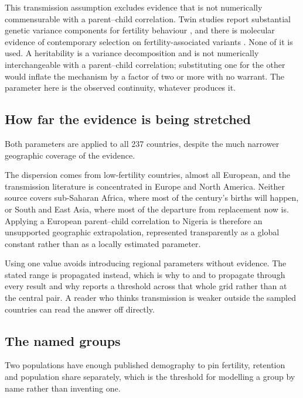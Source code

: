 This transmission assumption excludes evidence that is not numerically
commensurable with a parent--child correlation. Twin studies report substantial
genetic variance components for
fertility behaviour \citep{kohler1999}, and there is molecular evidence of
contemporary selection on fertility-associated variants
\citep{beauchamp2016,kong2017}. None of it is used. A heritability is a variance
decomposition and is not numerically interchangeable with a parent--child
correlation; substituting one for the other would inflate the mechanism by a
factor of two or more with no warrant. The parameter here is the observed
continuity, whatever produces it.

\subsection{How far the evidence is being stretched}
\label{sec:extrapolation}

Both parameters are applied to all 237 countries, despite the much narrower
geographic coverage of the evidence.

The dispersion comes from \CVCountries{} low-fertility countries, almost all
European, and the transmission literature is concentrated in Europe and North
America. Neither source covers sub-Saharan Africa, where most of the century's
births will happen, or South and East Asia, where most of the departure from
replacement now is. Applying a European parent--child correlation to Nigeria is
therefore an unsupported geographic extrapolation, represented transparently as
a global constant rather than as a locally estimated parameter.

Using one value avoids introducing regional parameters without evidence. The
stated range is propagated instead, which is why \FamilySizeCVLow{} to
\FamilySizeCVHigh{} and \PersistenceLow{} to \PersistenceHigh{} propagate through
every result and why  reports a threshold across that whole
grid rather than at the central pair. A reader who thinks transmission is weaker
outside the sampled countries can read the answer off 
directly.

\subsection{The named groups}

Two populations have enough published demography to pin fertility, retention and
population share separately, which is the threshold for modelling a group by name
rather than inventing one.

